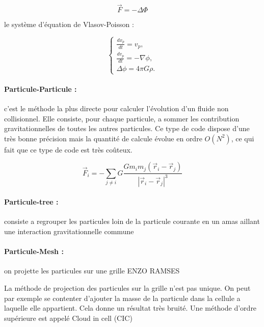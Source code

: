 \begin{equation}
\vec{F}=-\Delta \Phi
\end{equation}

le système d'équation de Vlasov-Poisson :

\begin{equation}
\begin{cases}

\frac{d{x}_p}{dt} = { v}_p, \\
\frac{d{ v}_p}{dt} = -\nabla \phi , \\
\Delta \phi= 4\pi G \rho.

\end{cases}
\label{eq:Ncorps}
\end{equation}


\paragraph{Particule-Particule : } c'est le méthode la plus directe pour calculer l'évolution d'un fluide non collisionnel. 
Elle consiste, pour chaque particule, a sommer les contribution gravitationnelles de toutes les autres particules.
Ce type de code dispose d'une très bonne précision mais la quantité de calcule évolue en ordre $O(N^2)$, ce qui fait que ce type de code est très coûteux.

\begin{equation}
\vec{F}_i=-\sum_{j\neq i} G \frac{G m_i m_j(\vec{r}_i - \vec{r}_j) }{ |\vec{r}_i - \vec{r}_j |^3}
\end{equation}

\paragraph{Particule-tree : } consiste a regrouper les particules loin de la particule courante en un amas aillant une interaction gravitationnelle commune

\paragraph{Particule-Mesh : } on projette les particules sur une grille
ENZO %
RAMSES

La méthode de projection des particules sur la grille n'est pas unique.
On peut par exemple se contenter d'ajouter la masse de la particule dans la cellule a laquelle elle appartient.
Cela donne un résultat très bruité.
Une méthode d'ordre supérieure est appelé Cloud in cell (CIC)

